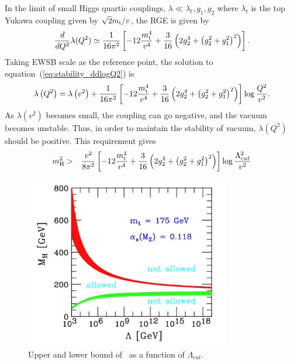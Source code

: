 In the limit of small Higgs quartic couplings, $\lambda \ll \lambda_t, g_1, g_2$ 
where $\lambda_t$ is the top Yukawa coupling given by $\sqrt{2} m_{\mathrm{t}} / v$, the RGE is 
given by \cite{Djouadi20081}
\begin{eqnarray}
\label{eq:stability_ddlogQ2}
\frac{d}{dQ^2} \lambda (Q^2)  
\simeq
\frac{1}{16\pi^2}  
\left[ -12 \frac{m_{\mathrm{t}}^4}{v^4} + \frac{3}{16} \left(2g_2^4 + \left(g_2^2+g_1^2\right)^2 \right)   \right].
\end{eqnarray} 
Taking EWSB scale as the reference point, the solution to equation~(\ref{eq:stability_ddlogQ2}) is  
\begin{eqnarray} 
\lambda\left(Q^2\right) 
= 
\lambda\left(v^2\right)  
+ 
\frac{1}{16\pi^2}  \left[ -12 \frac{m_{\mathrm{t}}^4}{v^4} 
                          + \frac{3}{16} \left(2g_2^4 + \left(g_2^2+g_1^2\right)^2 \right) \right]
                    \log \frac{Q^2}{v^2}.
\end{eqnarray} 
As $\lambda(v^2)$ becomes small, the coupling can go negative, and the vacuum becomes unstable.   
Thus, in order to maintain the stability of vacuum, $\lambda\left(Q^2\right)$ should be 
positive. This requirement gives
\begin{eqnarray} 
m_{\mathrm{H}}^2 
&>&
\frac{v^2}{8\pi^2}  \left[ -12 \frac{m_{\mathrm{t}}^4}{v^4} 
                          + \frac{3}{16} \left(2g_2^4 + \left(g_2^2+g_1^2\right)^2 \right) \right]
                    \log \frac{\Lambda_{cut}^2}{v^2} 
\end{eqnarray} 
%
\begin{figure}[t]
\centering
\includegraphics[width=0.8\textwidth]{figures/trivial_vacstab.pdf}
\caption{ Upper and lower bound of \mHi\ as a function of $\Lambda_{cut}$.
}
\label{fig:trivial_vacstab}
\end{figure}
\\

